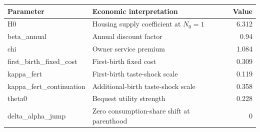 \begingroup\small
\setlength{\tabcolsep}{3pt}
\renewcommand{\arraystretch}{1.04}
\begin{tabularx}{\linewidth}{XXr}
\toprule
Parameter & Economic interpretation & Value \\
\midrule
H0 & Housing supply coefficient at $N_0=1$ & 6.312 \\
beta\allowbreak\_annual & Annual discount factor & 0.94 \\
chi & Owner service premium & 1.084 \\
first\allowbreak\_birth\allowbreak\_fixed\allowbreak\_cost & First-birth fixed cost & 0.309 \\
kappa\allowbreak\_fert & First-birth taste-shock scale & 0.119 \\
kappa\allowbreak\_fert\allowbreak\_continuation & Additional-birth taste-shock scale & 0.358 \\
theta0 & Bequest utility strength & 0.228 \\
delta\allowbreak\_alpha\allowbreak\_jump & Zero consumption-share shift at parenthood & 0 \\
\bottomrule
\end{tabularx}
\endgroup
